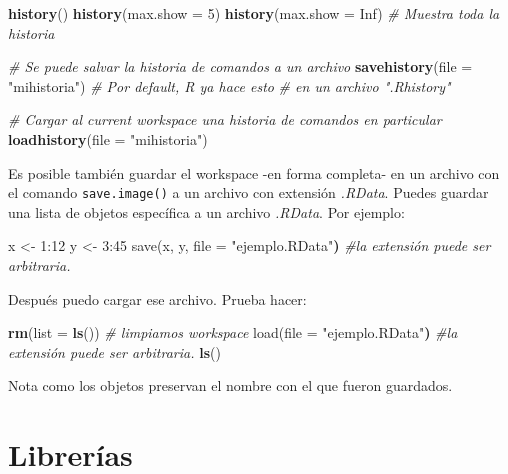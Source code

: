 \documentclass[]{article}
\newenvironment{Shaded}{\begin{snugshade}}{\end{snugshade}}
\newcommand{\KeywordTok}[1]{\textcolor[rgb]{0.13,0.29,0.53}{\textbf{{#1}}}}
\newcommand{\DataTypeTok}[1]{\textcolor[rgb]{0.13,0.29,0.53}{{#1}}}
\newcommand{\DecValTok}[1]{\textcolor[rgb]{0.00,0.00,0.81}{{#1}}}
\newcommand{\StringTok}[1]{\textcolor[rgb]{0.31,0.60,0.02}{{#1}}}
\newcommand{\CommentTok}[1]{\textcolor[rgb]{0.56,0.35,0.01}{\textit{{#1}}}}
\newcommand{\OtherTok}[1]{\textcolor[rgb]{0.56,0.35,0.01}{{#1}}}
\newcommand{\ErrorTok}[1]{\textbf{{#1}}}
\newcommand{\NormalTok}[1]{{#1}}
\begin{document}
\begin{Shaded}
\begin{Highlighting}[]
\KeywordTok{history}\NormalTok{()}
\KeywordTok{history}\NormalTok{(}\DataTypeTok{max.show =} \DecValTok{5}\NormalTok{)}
\KeywordTok{history}\NormalTok{(}\DataTypeTok{max.show =} \OtherTok{Inf}\NormalTok{) }\CommentTok{# Muestra toda la historia}

\CommentTok{# Se puede salvar la historia de comandos a un archivo}
\KeywordTok{savehistory}\NormalTok{(}\DataTypeTok{file =} \StringTok{"mihistoria"}\NormalTok{) }\CommentTok{# Por default, R ya hace esto }
\CommentTok{# en un archivo ".Rhistory"}

\CommentTok{# Cargar al current workspace una historia de comandos en particular}
\KeywordTok{loadhistory}\NormalTok{(}\DataTypeTok{file =} \StringTok{"mihistoria"}\NormalTok{)}
\end{Highlighting}
\end{Shaded}

Es posible también guardar el workspace -en forma completa- en un
archivo con el comando \texttt{save.image()} a un archivo con extensión
\emph{.RData}. Puedes guardar una lista de objetos específica a un
archivo \emph{.RData}. Por ejemplo:

\begin{Shaded}
\begin{Highlighting}[]
\NormalTok{x <-}\StringTok{ }\DecValTok{1}\NormalTok{:}\DecValTok{12}
\NormalTok{y <-}\StringTok{ }\DecValTok{3}\NormalTok{:}\DecValTok{45}
\NormalTok{save(x, y, file = }\StringTok{"ejemplo.RData"}\ErrorTok{)} \CommentTok{#la extensión puede ser arbitraria.}
\end{Highlighting}
\end{Shaded}

Después puedo cargar ese archivo. Prueba hacer:

\begin{Shaded}
\begin{Highlighting}[]
\KeywordTok{rm}\NormalTok{(}\DataTypeTok{list =} \KeywordTok{ls}\NormalTok{()) }\CommentTok{# limpiamos workspace}
\NormalTok{load(file = }\StringTok{"ejemplo.RData"}\ErrorTok{)} \CommentTok{#la extensión puede ser arbitraria.}
\KeywordTok{ls}\NormalTok{()}
\end{Highlighting}
\end{Shaded}

Nota como los objetos preservan el nombre con el que fueron guardados.

\section{Librerías}\label{librerias}
\end{document}
